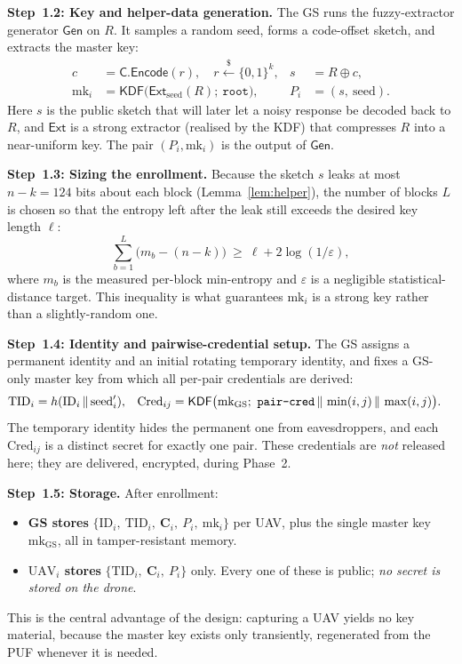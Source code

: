 \documentclass[11pt,a4paper]{article}
\begin{document}
\textbf{Step~1.2: Key and helper-data generation.}
The GS runs the fuzzy-extractor generator $\mathsf{Gen}$ on $R$. It samples a
random seed, forms a code-offset sketch, and extracts the master key:
\begin{align}
c &= \mathsf{C}.\mathsf{Encode}(r), \quad r \xleftarrow{\$} \{0,1\}^{k}, &
s &= R \oplus c, \\[1ex]
\text{mk}_i &= \mathsf{KDF}\big(\mathsf{Ext}_{\text{seed}}(R);\ \texttt{root}\big), &
P_i &= (s,\ \text{seed}).
\end{align}
Here $s$ is the public sketch that will later let a noisy response be decoded
back to $R$, and $\mathsf{Ext}$ is a strong extractor (realised by the KDF) that
compresses $R$ into a near-uniform key. The pair $(P_i,\text{mk}_i)$ is the
output of $\mathsf{Gen}$.

\textbf{Step~1.3: Sizing the enrollment.}
Because the sketch $s$ leaks at most $n-k=124$ bits about each block
(Lemma~\ref{lem:helper}), the number of blocks $L$ is chosen so that the
entropy left after the leak still exceeds the desired key length $\ell$:
\begin{equation}
\sum_{b=1}^{L}\big(m_b-(n-k)\big)\ \ge\ \ell + 2\log(1/\varepsilon),
\label{eq:budget}
\end{equation}
where $m_b$ is the measured per-block min-entropy and $\varepsilon$ is a
negligible statistical-distance target. This inequality is what guarantees
$\text{mk}_i$ is a strong key rather than a slightly-random one.

\textbf{Step~1.4: Identity and pairwise-credential setup.}
The GS assigns a permanent identity and an initial rotating temporary identity,
and fixes a GS-only master key from which all per-pair credentials are derived:
\begin{align}
\text{TID}_i &= h(\text{ID}_i \,\|\, \text{seed}_i'), &
\text{Cred}_{ij} &= \mathsf{KDF}\big(\text{mk}_{\text{GS}};\ \texttt{pair\text{-}cred}\,\|\,\min(i,j)\,\|\,\max(i,j)\big).
\end{align}
The temporary identity hides the permanent one from eavesdroppers, and each
$\text{Cred}_{ij}$ is a distinct secret for exactly one pair. These credentials
are \emph{not} released here; they are delivered, encrypted, during Phase~2.

\textbf{Step~1.5: Storage.}
After enrollment:
\begin{itemize}[leftmargin=*]
  \item \textbf{GS stores} $\{\text{ID}_i,\ \text{TID}_i,\ \bm{C}_i,\ P_i,\ \text{mk}_i\}$ per UAV, plus the single master key $\text{mk}_{\text{GS}}$, all in tamper-resistant memory.
  \item \textbf{$\text{UAV}_i$ stores} $\{\text{TID}_i,\ \bm{C}_i,\ P_i\}$ only. Every one of these is public; \emph{no secret is stored on the drone}.
\end{itemize}
This is the central advantage of the design: capturing a UAV yields no key
material, because the master key exists only transiently, regenerated from the
PUF whenever it is needed.
\end{document}
